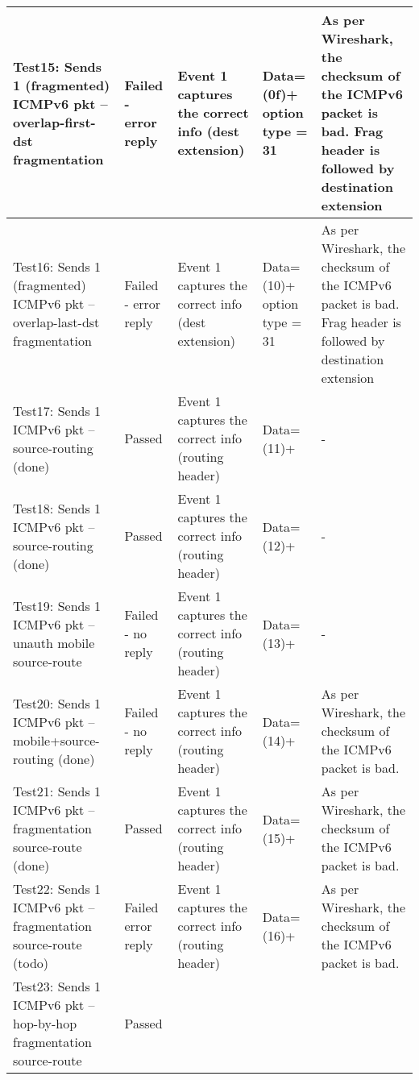 \documentclass{article}
\begin{document}
\begin{longtable}{|p{1.5in}|p{0.5in}|p{1in}|p{0.8in}|p{1.2in}}
Test15: Sends 1 (fragmented) ICMPv6 pkt -- overlap-first-dst fragmentation &
Failed - error reply &
Event 1 captures the correct info (dest extension) &
Data=(0f)+ option type = 31 &
As per Wireshark, the checksum of the ICMPv6 packet is bad. 
Frag header is followed by destination extension
\\ \hline
Test16: Sends 1 (fragmented) ICMPv6 pkt -- overlap-last-dst fragmentation &
Failed - error reply &
Event 1 captures the correct info (dest extension) &
Data=(10)+ option type = 31 &
As per Wireshark, the checksum of the ICMPv6 packet is bad. 
Frag header is followed by destination extension
\\ \hline
Test17: Sends 1 ICMPv6 pkt -- source-routing (done) &
Passed &
Event 1 captures the correct info (routing header) &
Data=(11)+ &
-
\\ \hline
Test18: Sends 1 ICMPv6 pkt -- source-routing (done) &
Passed &
Event 1 captures the correct info (routing header) &
Data=(12)+ &
-
\\ \hline
Test19: Sends 1 ICMPv6 pkt -- unauth mobile source-route &
Failed - no reply &
Event 1 captures the correct info (routing header) &
Data=(13)+ &
-
\\ \hline
Test20: Sends 1 ICMPv6 pkt -- mobile+source-routing (done) &
Failed - no reply &
Event 1 captures the correct info (routing header) &
Data=(14)+ &
As per Wireshark, the checksum of the ICMPv6 packet is bad.
\\ \hline
Test21: Sends 1 ICMPv6 pkt -- fragmentation source-route (done) &
Passed &
Event 1 captures the correct info (routing header) &
Data=(15)+ &
As per Wireshark, the checksum of the ICMPv6 packet is bad.
\\ \hline
Test22: Sends 1 ICMPv6 pkt -- fragmentation source-route (todo) &
Failed error reply &
Event 1 captures the correct info (routing header) &
Data=(16)+ &
As per Wireshark, the checksum of the ICMPv6 packet is bad.
\\ \hline
Test23: Sends 1 ICMPv6 pkt -- hop-by-hop fragmentation source-route &
Passed &

\end{longtable}
\end{document}
